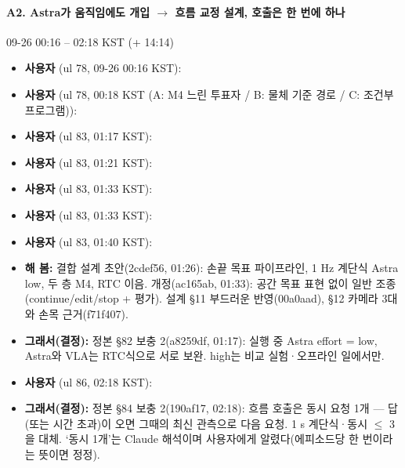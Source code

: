 \paragraph{A2. Astra가 움직임에도 개입 $\rightarrow$ 흐름 교정 설계, 호출은 한 번에 하나}
{\small 09-26 00:16 -- 02:18 KST (+ 14:14)}
\begin{itemize}
  \item \textbf{사용자} (ul 78, 09-26 00:16 KST): 
  \item \textbf{사용자} (ul 78, 00:18 KST (A: M4 느린 투표자 / B: 물체 기준 경로 / C: 조건부 프로그램)): 
  \item \textbf{사용자} (ul 83, 01:17 KST): 
  \item \textbf{사용자} (ul 83, 01:21 KST): 
  \item \textbf{사용자} (ul 83, 01:33 KST): 
  \item \textbf{사용자} (ul 83, 01:33 KST): 
  \item \textbf{사용자} (ul 83, 01:40 KST): 
  \item \textbf{해 봄:} 결합 설계 초안(2cdef56, 01:26): 손끝 목표 파이프라인, 1 Hz 계단식 Astra low, 두 층 M4, RTC 이음. 개정(ac165ab, 01:33): 공간 목표 표현 없이 일반 조종(continue/edit/stop + 평가). 설계 §11 부드러운 반영(00a0aad), §12 카메라 3대와 손목 근거(f71f407).
  \item \textbf{그래서(결정):} 정본 §82 보충 2(a8259df, 01:17): 실행 중 Astra effort = low, Astra와 VLA는 RTC식으로 서로 보완. high는 비교 실험·오프라인 일에서만.
  \item \textbf{사용자} (ul 86, 02:18 KST): 
  \item \textbf{그래서(결정):} 정본 §84 보충 2(190af17, 02:18): 흐름 호출은 동시 요청 1개 --- 답(또는 시간 초과)이 오면 그때의 최신 관측으로 다음 요청. 1 s 계단식·동시 $\leq$ 3을 대체. `동시 1개'는 Claude 해석이며 사용자에게 알렸다(에피소드당 한 번이라는 뜻이면 정정).

\end{itemize}
